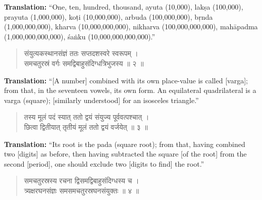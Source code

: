 \documentclass[11pt,a4paper]{article}
\newcommand{\dev}[1]{{\devanagarifont #1}}
\newenvironment{sanskritverse}{\begin{verse}\devanagarifont\large\centering}{\end{verse}}
\begin{document}
\vspace{0.3cm}
\noindent\textbf{Translation:} ``One, ten, hundred, thousand, ayuta (10,000), lakṣa (100,000), prayuta (1,000,000), koṭi (10,000,000), arbuda (100,000,000), bṛnda (1,000,000,000), kharva (10,000,000,000), nikharva (100,000,000,000), mahāpadma (1,000,000,000,000), śaṅku (10,000,000,000,000).''

\vspace{0.5cm}

\begin{tcolorbox}[colback=white,colframe=rulecolor,title={\dev{\textbf{गणित २ — वर्गः (Square)}}}]
\begin{sanskritverse}
\dev{संयुत्यकस्थानसंज्ञं ततः सप्तदशस्वरे स्वरूपम् ।\\
समचतुरस्रं वर्गः समद्विबाहुसंदिग्धत्रिभुजस्य ॥ २ ॥}
\end{sanskritverse}
\end{tcolorbox}

\vspace{0.3cm}
\noindent\textbf{Translation:} ``[A number] combined with its own place-value is called [varga]; from that, in the seventeen vowels, its own form. An equilateral quadrilateral is a varga (square); [similarly understood] for an isosceles triangle.''

\vspace{0.5cm}

\begin{tcolorbox}[colback=white,colframe=rulecolor,title={\dev{\textbf{गणित ३ — वर्गमूलम् (Square Root)}}}]
\begin{sanskritverse}
\dev{तस्य मूलं पदं स्यात् ततो द्वयं संयुज्य पूर्ववत्पश्चात् ।\\
छित्वा द्वितीयात् तृतीयं मूलं ततो द्वयं वर्जयेत् ॥ ३ ॥}
\end{sanskritverse}
\end{tcolorbox}

\vspace{0.3cm}
\noindent\textbf{Translation:} ``Its root is the pada (square root); from that, having combined two [digits] as before, then having subtracted the square [of the root] from the second [period], one should exclude two [digits to find] the root.''

\vspace{0.5cm}

\begin{tcolorbox}[colback=white,colframe=rulecolor,title={\dev{\textbf{गणित ४ — घनः (Cube)}}}]
\begin{sanskritverse}
\dev{समचतुरस्रस्य रचना द्विसमद्विबाहुसंदिग्धस्य च ।\\
त्र्यक्षरघनसंज्ञः समसमचतुरस्रघनसंयुक्तः ॥ ४ ॥}
\end{sanskritverse}
\end{tcolorbox}
\end{document}
